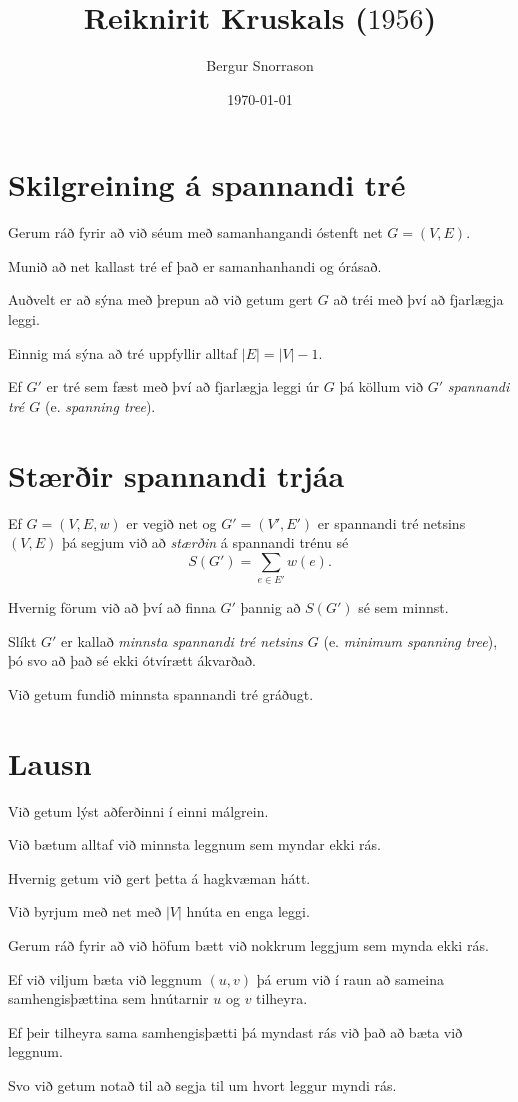 \title{Reiknirit Kruskals ($1956$)}
\author{Bergur Snorrason}
\date{\today}



\frame{\titlepage}

\section{Skilgreining á spannandi tré}
{
	{
		\item<1-> Gerum ráð fyrir að við séum með samanhangandi óstenft net $G = (V, E)$.
		\item<2-> Munið að net kallast tré ef það er samanhanhandi og órásað.
		\item<3-> Auðvelt er að sýna með þrepun að við getum gert $G$ að tréi með því að fjarlægja leggi.
		\item<4-> Einnig má sýna að tré uppfyllir alltaf $|E| = |V| - 1$.
		\item<5-> Ef $G'$ er tré sem fæst með því að fjarlægja leggi úr $G$ þá köllum við $G'$ \emph{spannandi tré $G$} (e. \emph{spanning tree}).
	}
}

\section{Stærðir spannandi trjáa}
{
	{
		\item<1-> Ef $G = (V, E, w)$ er vegið net og $G' = (V', E')$ er spannandi tré netsins $(V, E)$ þá segjum við að \emph{stærðin}
					á spannandi trénu sé
		\[
			S(G') = \sum_{e \in E'} w(e).
		\]
		\item<2-> Hvernig förum við að því að finna $G'$ þannig að $S(G')$ sé sem minnst.
		\item<3-> Slíkt $G'$ er kallað \emph{minnsta spannandi tré netsins $G$} (e. \emph{minimum spanning tree}),
					þó svo að það sé ekki ótvírætt ákvarðað.
		\item<4-> Við getum fundið minnsta spannandi tré gráðugt.
	}
}

\section{Lausn}
{
	{
		\item<1-> Við getum lýst aðferðinni í einni málgrein.
		\item<2-> Við bætum alltaf við minnsta leggnum sem myndar ekki rás.
		\item<3-> Hvernig getum við gert þetta á hagkvæman hátt.
		\item<4-> Við byrjum með net með $|V|$ hnúta en enga leggi.
		\item<5-> Gerum ráð fyrir að við höfum bætt við nokkrum leggjum sem mynda ekki rás.
		\item<6-> Ef við viljum bæta við leggnum $(u, v)$ þá erum við í raun að sameina samhengisþættina sem hnútarnir $u$ og $v$ tilheyra.
		\item<7-> Ef þeir tilheyra sama samhengisþætti þá myndast rás við það að bæta við leggnum.
		\item<8-> Svo við getum notað  til að segja til um hvort leggur myndi rás.
	}
}

